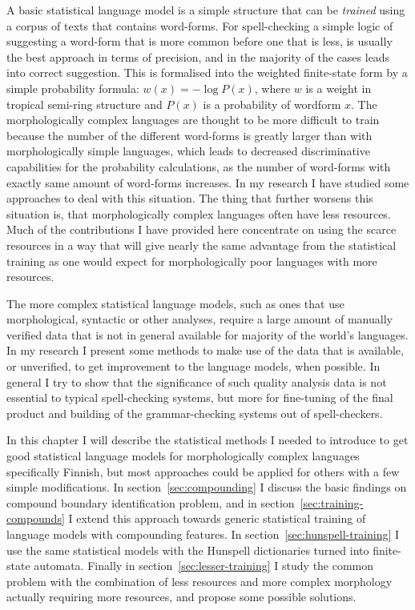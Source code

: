 \documentclass[officiallayout]{unihelcompling}
\begin{document}
A basic statistical language model is a simple structure that can be
\emph{trained} using a corpus of texts that contains word-forms. For
spell-checking a simple logic of suggesting a word-form that is more common
before one that is less, is usually the best approach in terms of precision,
and in the majority of the cases leads into correct suggestion. This is
formalised into the weighted finite-state form by a simple probability formula:
$w(x) = -\log P(x)$, where $w$ is a weight in tropical semi-ring structure and
$P(x)$ is a probability of wordform $x$.  The morphologically complex languages
are thought to be more difficult to train because the number of the different
word-forms is greatly larger than with morphologically simple languages, which
leads to decreased discriminative capabilities for the probability
calculations, as the number of word-forms with exactly same amount of
word-forms increases. In my research I have studied some approaches to deal
with this situation. The thing that further worsens this situation is, that
morphologically complex languages often have less resources. Much of the
contributions I have provided here concentrate on using the scarce resources in
a way that will give nearly the same advantage from the statistical training as
one would expect for morphologically poor languages with more resources.

The more complex statistical language models, such as ones that use
morphological, syntactic or other analyses, require a large amount of
manually verified data that is not in general available for majority of the
world's languages. In my research I present some methods to make use of the
data that is available, or unverified, to get improvement to the language
models, when possible. In general I try to show that the significance of such
quality analysis data is not essential to typical spell-checking systems, but
more for fine-tuning of the final product and building of the grammar-checking
systems out of spell-checkers.

In this chapter I will describe the statistical methods I needed to introduce
to get good statistical language models for morphologically complex languages
specifically Finnish, but most approaches could be applied for others with a
few simple modifications. In section~\ref{sec:compounding} I discuss the basic
findings on compound boundary identification problem, and in
section~\ref{sec:training-compounds} I extend this approach towards generic
statistical training of language models with compounding features. In
section~\ref{sec:hunspell-training} I use the same statistical models with the
Hunspell dictionaries turned into finite-state automata. Finally in
section~\ref{sec:lesser-training} I study the common problem with the
combination of less resources and more complex morphology actually requiring
more resources, and propose some possible solutions.
\end{document}
